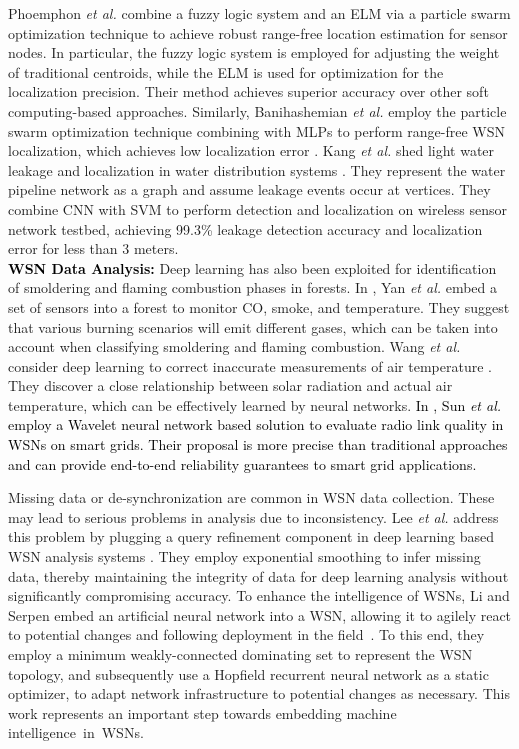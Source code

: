 \documentclass[journal,comsoc,letter]{IEEEtran}
\newcommand{\rev}[1]{\textcolor{black}{#1}}
\begin{document}
Phoemphon \emph{et al.} \cite{phoemphon2018hybrid} combine a fuzzy logic system and an ELM via a particle swarm optimization technique to achieve robust range-free location estimation for sensor nodes. In particular, the fuzzy logic system is employed for adjusting the weight of traditional centroids, while the ELM is used for optimization for the localization precision. Their method achieves superior accuracy over other soft computing-based approaches. Similarly, Banihashemian \emph{et al.} employ the particle swarm optimization technique combining with MLPs to perform range-free WSN localization, which achieves low localization error \cite{banihashemian2018new}. Kang \emph{et al.} shed light water leakage and localization in water distribution systems \cite{kang2018novel}. They represent the water pipeline network as a graph and assume leakage events occur at vertices. They combine CNN with SVM to perform detection and localization on wireless sensor network testbed, achieving 99.3\% leakage detection accuracy and localization error for less than 3 meters.\\

\rev{\noindent \textbf{WSN Data Analysis:}} Deep learning has also been exploited for identification of smoldering and flaming combustion phases in forests. In \cite{yan2016real}, Yan \emph{et al.} embed a set of sensors into a forest to monitor CO, smoke, and temperature.  They suggest that various burning scenarios will emit different gases, which can be taken into account when classifying smoldering and flaming combustion. Wang \emph{et al.} consider deep learning to correct inaccurate measurements of air temperature \cite{wang2017temperature}. They discover a close relationship between solar radiation and actual air temperature, which can be effectively learned by neural networks. \rev{In \cite{sun2017wnn}, Sun \emph{et al.} employ a Wavelet neural network based solution to evaluate radio link quality in WSNs on smart grids. Their proposal is more precise than traditional approaches and can provide end-to-end reliability guarantees to smart grid applications. }

Missing data or de-synchronization are common in WSN data collection. These may lead to serious problems in analysis due to inconsistency. Lee \emph{et al.} address this problem by plugging a query refinement component in deep learning based WSN analysis systems \cite{lee2017deep222}. They employ exponential smoothing to infer missing data, thereby maintaining the integrity of data for deep learning analysis without significantly compromising  accuracy. To enhance the intelligence of WSNs, Li and Serpen embed an artificial neural network into a WSN, allowing it to agilely react to potential changes and following deployment in the field~\cite{li2016adaptive}. To this end, they employ a minimum weakly-connected dominating set to represent the WSN topology, and subsequently use a Hopfield recurrent neural network as a static optimizer, to adapt network infrastructure to potential changes as necessary. This work represents an important step towards embedding machine \mbox{intelligence in WSNs}. \\
\end{document}
